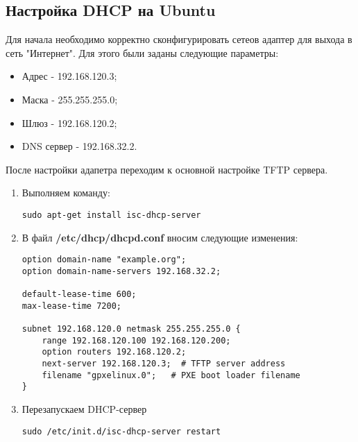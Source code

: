 \documentclass[14pt,a4paper,report]{report}
\begin{document}
\subsection{Настройка DHCP на Ubuntu}
Для начала необходимо корректно сконфигурировать сетеов адаптер для выхода в сеть "Интернет". Для этого были заданы следующие параметры:
\begin{itemize}
\item Адрес - 192.168.120.3;
\item Маска - 255.255.255.0;
\item Шлюз - 192.168.120.2;
\item DNS сервер - 192.168.32.2.
\end{itemize}
После настройки адапетра переходим к основной настройке TFTP сервера.
\begin{enumerate}
\item Выполняем команду:
\begin{lstlisting}[language={}]
sudo apt-get install isc-dhcp-server
\end{lstlisting}
\item В файл \textbf{/etc/dhcp/dhcpd.conf} вносим следующие изменения:
\begin{lstlisting}[language={}]
option domain-name "example.org";
option domain-name-servers 192.168.32.2;

default-lease-time 600;
max-lease-time 7200;

subnet 192.168.120.0 netmask 255.255.255.0 {
    range 192.168.120.100 192.168.120.200;
    option routers 192.168.120.2;
    next-server 192.168.120.3;  # TFTP server address
    filename "gpxelinux.0";   # PXE boot loader filename
}
\end{lstlisting}
\item Перезапускаем DHCP-сервер
\begin{lstlisting}[language={}]
sudo /etc/init.d/isc-dhcp-server restart
\end{lstlisting}
\end{enumerate}
\end{document}
